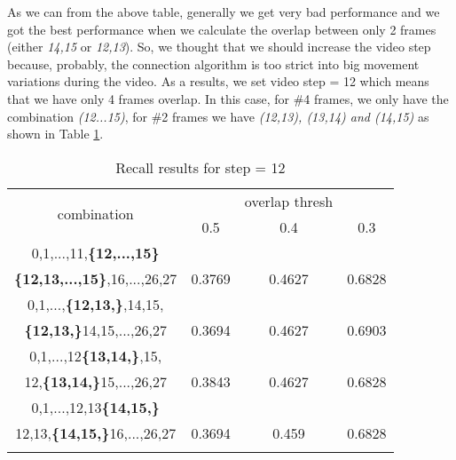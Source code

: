 As we can from the above table, generally we get very bad performance and we got the best performance when we calculate the overlap between only 2 frames (either \textit{14,15} or \textit{12,13}).
So, we thought that we should increase the video step because, probably, the connection algorithm is too strict into big movement variations during  the video. As a results, we set video step = 12 which
means that we have only 4 frames overlap. In this case,  for \#4 frames, we only have the combination \textit{(12...15)}, for \#2 frames we have \textit{(12,13), (13,14) and (14,15)} as shown in
Table \ref{table:step12_16}.

\begin{center}
\begin{longtable}{||c||c c c||}

  \hline
  \multirow{2}{5em}{combination} & {} &overlap thresh & {} \\
                                    &  0.5  &  0.4 &  0.3 \\         
  \hline  \hline
  0,1,...,11,\textbf{\{12,...,15\}}           & {} & {} & {} \\
  \textbf{\{12,13,...,15\}},16,...,26,27         & 0.3769 & 0.4627 & 0.6828 \\
  \hline     \hline                          

  0,1,...,\textbf{\{12,13,\}},14,15,          & {} & {} & {} \\
  \textbf{\{12,13,\}}14,15,...,26,27          & 0.3694   & 0.4627 & 0.6903 \\
  \hline                          
  0,1,...,12\textbf{\{13,14,\}},15,           & {} & {} & {} \\
  12,\textbf{\{13,14,\}}15,...,26,27          & 0.3843   & 0.4627 & 0.6828 \\
  \hline                          
  0,1,...,12,13\textbf{\{14,15,\}}            & {} & {} & {} \\
  12,13,\textbf{\{14,15,\}}16,...,26,27       & 0.3694   & 0.459 & 0.6828 \\
  \hline     \hline                          

  \caption{Recall results for step = 12}
  \label{table:step12_16}
\end{longtable} 
\end{center}

